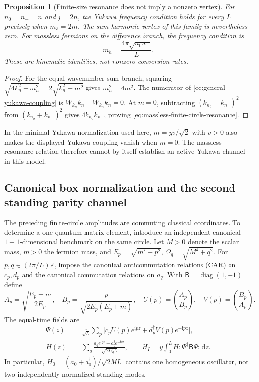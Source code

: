 \documentclass[11pt,a4paper,oneside]{book}
\theoremstyle{plain}
\newtheorem{proposition}[theorem]{Proposition}
\theoremstyle{definition}
\theoremstyle{remark}
\newcommand{\Z}{\mathbb Z}
\newcommand{\dd}{\mathrm d}
\newcommand{\ii}{\mathrm i}
\newcommand{\diag}{\operatorname{diag}}
\newcommand{\src}[2]{\cite{#1}}
\begin{document}
\begin{proposition}[Finite-size resonance does not imply a nonzero vertex]
\label{prop:finite-circle-resonance}
For $n_0=n_-=n$ and $j=2n$, the Yukawa frequency condition holds for
every $L$ precisely when $m_h=2m$.  The sum-harmonic vertex of this
family is nevertheless zero.  For massless fermions on the difference
branch, the frequency condition is
\begin{equation}
 m_h=\frac{4\pi\sqrt{n_0n_-}}{L}.
 \label{eq:massless-finite-circle-resonance}
\end{equation}
These are kinematic identities, not nonzero conversion rates.
\end{proposition}
\begin{proof}
For the equal-wavenumber sum branch, squaring
$\sqrt{4k_n^2+m_h^2}=2\sqrt{k_n^2+m^2}$ gives $m_h^2=4m^2$.
The numerator of \eqref{eq:general-yukawa-coupling} is
$W_{k_n}k_n-W_{k_n}k_n=0$.  At $m=0$, subtracting
$(k_{n_0}-k_{n_-})^2$ from $(k_{n_0}+k_{n_-})^2$ gives
$4k_{n_0}k_{n_-}$, proving \eqref{eq:massless-finite-circle-resonance}.
\end{proof}
\src{R20}{thm:v20v41-resonances,thm:v20v31-coupling}

In the minimal Yukawa normalization used here, $m=yv/\sqrt2$ with
$v>0$ also makes the displayed Yukawa coupling vanish when $m=0$.
The massless resonance relation therefore cannot by itself establish
an active Yukawa channel in this model.

\subsection{Canonical box normalization and the second standing parity channel}
\label{sec:canonical-box}
The preceding finite-circle amplitudes are commuting classical
coordinates.  To determine a one-quantum matrix element, introduce an
independent canonical $1+1$-dimensional benchmark on the same circle.
Let $M>0$ denote the scalar mass, $m>0$ the fermion mass, and
$E_p=\sqrt{m^2+p^2}$, $\Omega_q=\sqrt{M^2+q^2}$.  For
$p,q\in(2\pi/L)\Z$, impose the canonical anticommutation relations
(CAR) on $c_p,d_p$ and the canonical commutation relations on $a_q$.
With $\mathsf B=\diag(1,-1)$ define
\begin{equation}
 A_p=\sqrt{\frac{E_p+m}{2E_p}},\quad
 B_p=\frac{p}{\sqrt{2E_p(E_p+m)}},\quad
 U(p)=\binom{A_p}{B_p},\quad V(p)=\binom{B_p}{A_p}.
 \label{eq:canonical-spinors}
\end{equation}
The equal-time fields are
\begin{equation}
 \begin{split}
 \Psi(z)&=\frac1{\sqrt L}\sum_p
       \bigl[c_pU(p)e^{\ii pz}+d_p^\dagger V(p)e^{-\ii pz}\bigr],\\
 H(z)&=\sum_q\frac{a_qe^{\ii qz}+a_q^\dagger e^{-\ii qz}}
                         {\sqrt{2\Omega_qL}},\qquad
 H_I=y\int_0^L H:\!\Psi^\dagger\mathsf B\Psi\!:\,\dd z.
 \end{split}
 \label{eq:canonical-box-fields}
\end{equation}
In particular, $H_0=(a_0+a_0^\dagger)/\sqrt{2ML}$ contains one
homogeneous oscillator, not two independently normalized standing modes.
\end{document}
